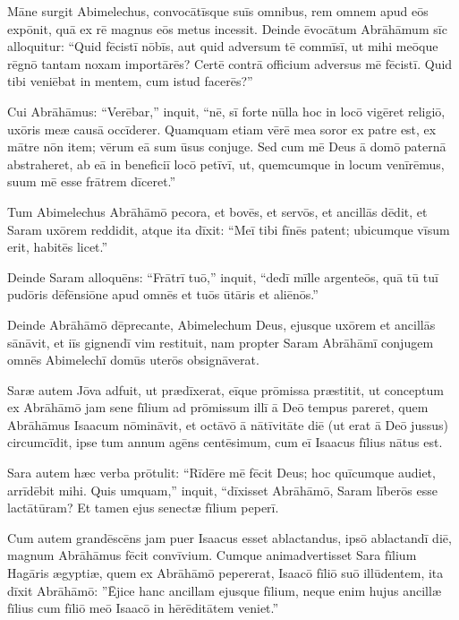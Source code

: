 \Versus Māne surgit Abimelechus, convocātīsque suīs omnibus, rem omnem apud eōs expōnit, quā ex rē magnus eōs metus incessit.
\Versus Deinde ēvocātum Abrāhāmum sīc alloquitur: ``Quid fēcistī nōbīs, aut quid adversum tē commīsī, ut mihi meōque rēgnō tantam noxam importārēs? Certē contrā officium adversus mē fēcistī.
\Versus Quid tibi veniēbat in mentem, cum istud facerēs?''

\Versus Cui Abrāhāmus: ``Verēbar,'' inquit, ``nē, sī forte nūlla hoc in locō vigēret religiō, uxōris meæ causā occīderer.
\Versus Quamquam etiam vērē mea soror ex patre est, ex mātre nōn item; vērum eā sum ūsus conjuge.
\Versus Sed cum mē Deus ā domō paternā abstraheret, ab eā in beneficiī locō petīvī, ut, quemcumque in locum venīrēmus, suum mē esse frātrem dīceret.''

\Versus Tum Abimelechus Abrāhāmō pecora, et bovēs, et servōs, et ancillās dēdit, et Saram uxōrem reddidit,
\Versus atque ita dīxit: ``Meī tibi fīnēs patent; ubicumque vīsum erit, habitēs licet.''

\Versus Deinde Saram alloquēns: ``Frātrī tuō,'' inquit, ``dedī mīlle argenteōs, quā tū tuī pudōris dēfēnsiōne apud omnēs et tuōs ūtāris et aliēnōs.''

\Versus Deinde Abrāhāmō dēprecante, Abimelechum Deus, ejusque uxōrem et ancillās sānāvit, et iīs gignendī vim restituit,
\Versus nam propter Saram Abrāhāmī conjugem omnēs Abimelechī domūs uterōs obsignāverat.



\Caput
\Versus Saræ autem Jōva adfuit, ut prædīxerat, eīque prōmissa præstitit,
\Versus ut conceptum ex Abrāhāmō jam sene fīlium ad prōmissum illī ā Deō tempus pareret,
\Versus quem Abrāhāmus Isaacum nōmināvit,
\Versus et octāvō ā nātīvitāte diē (ut erat ā Deō jussus) circumcīdit,
\Versus ipse tum annum agēns centēsimum, cum eī Isaacus fīlius nātus est.

\Versus Sara autem hæc verba prōtulit: ``Rīdēre mē fēcit Deus; hoc quīcumque audiet, arrīdēbit mihi.
\Versus Quis umquam,'' inquit, ``dīxisset Abrāhāmō, Saram līberōs esse lactātūram? Et tamen ejus senectæ fīlium peperī.

\Versus Cum autem grandēscēns jam puer Isaacus esset ablactandus, ipsō ablactandī diē, magnum Abrāhāmus fēcit convīvium.
\Versus Cumque animadvertisset Sara fīlium Hagāris ægyptiæ, quem ex Abrāhāmō pepererat, Isaacō fīliō suō illūdentem,
\Versus ita dīxit Abrāhāmō: ''Ējice hanc ancillam ejusque fīlium, neque enim hujus ancillæ fīlius cum fīliō meō Isaacō in hērēditātem veniet.''

